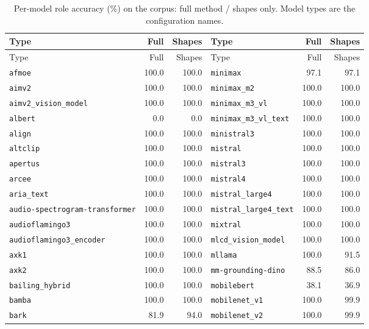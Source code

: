 \scriptsize\setlength{\tabcolsep}{3pt}
\begin{longtable}{@{}lrr@{\hspace{24pt}}lrr@{}}
\caption{Per-model role accuracy (\%) on the corpus: full method / shapes only. Model types are the  configuration names.}\label{tab:corpus-all}\\
\toprule Type & Full & Shapes & Type & Full & Shapes \\ \midrule\endfirsthead
\toprule Type & Full & Shapes & Type & Full & Shapes \\ \midrule\endhead
\bottomrule\endfoot
\texttt{afmoe} & 100.0 & 100.0 & \texttt{minimax} & 97.1 & 97.1 \\
\texttt{aimv2} & 100.0 & 100.0 & \texttt{minimax\_m2} & 100.0 & 100.0 \\
\texttt{aimv2\_vision\_model} & 100.0 & 100.0 & \texttt{minimax\_m3\_vl} & 100.0 & 100.0 \\
\texttt{albert} & 0.0 & 0.0 & \texttt{minimax\_m3\_vl\_text} & 100.0 & 100.0 \\
\texttt{align} & 100.0 & 100.0 & \texttt{ministral3} & 100.0 & 100.0 \\
\texttt{altclip} & 100.0 & 100.0 & \texttt{mistral} & 100.0 & 100.0 \\
\texttt{apertus} & 100.0 & 100.0 & \texttt{mistral3} & 100.0 & 100.0 \\
\texttt{arcee} & 100.0 & 100.0 & \texttt{mistral4} & 100.0 & 100.0 \\
\texttt{aria\_text} & 100.0 & 100.0 & \texttt{mistral\_large4} & 100.0 & 100.0 \\
\texttt{audio-spectrogram-transformer} & 100.0 & 100.0 & \texttt{mistral\_large4\_text} & 100.0 & 100.0 \\
\texttt{audioflamingo3} & 100.0 & 100.0 & \texttt{mixtral} & 100.0 & 100.0 \\
\texttt{audioflamingo3\_encoder} & 100.0 & 100.0 & \texttt{mlcd\_vision\_model} & 100.0 & 100.0 \\
\texttt{axk1} & 100.0 & 100.0 & \texttt{mllama} & 100.0 & 91.5 \\
\texttt{axk2} & 100.0 & 100.0 & \texttt{mm-grounding-dino} & 88.5 & 86.0 \\
\texttt{bailing\_hybrid} & 100.0 & 100.0 & \texttt{mobilebert} & 38.1 & 36.9 \\
\texttt{bamba} & 100.0 & 100.0 & \texttt{mobilenet\_v1} & 100.0 & 99.9 \\
\texttt{bark} & 81.9 & 94.0 & \texttt{mobilenet\_v2} & 100.0 & 99.9 \\

\end{longtable}
